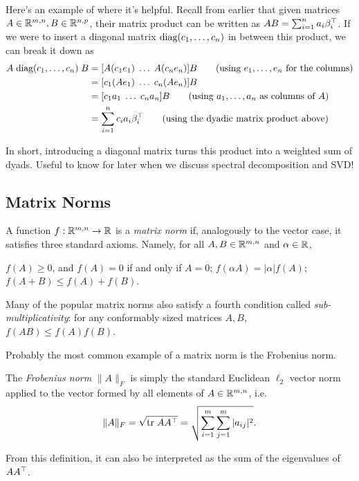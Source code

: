 \documentclass[11 pt]{scrartcl}
\begin{document}
Here's an example of where it's helpful. 
Recall from earlier that given matrices $A\in \mathbb R^{m,n}, B \in \mathbb R^{n,p}$, their matrix product can be written as $AB = \sum_{i=1}^n a_i \beta_i^\top$.  
If we were to insert a diagonal matrix $\text{diag}(c_1,\dots, c_n)$ in between this product, we can break it down as 
\begin{align*}
    A \;\text{diag}(c_1, \dots, c_n)\; B &= [A(c_1e_1)\; \dots \; A(c_n e_n)] B  \tag{using $e_1, \dots, e_n$ for the columns} \\
                                   &= [c_1 (Ae_1)\; \dots \; c_n (Ae_n)] B \\ 
                                   &= [c_1 a_1 \; \dots \; c_n a_n ] B \tag{using $a_1,\dots, a_n$ as columns of $A$}\\ 
                                   &= \sum_{i=1}^n c_i a_i\beta_i^\top \tag{using the dyadic matrix product above}
\end{align*}

In short, introducing a diagonal matrix turns this product into a weighted sum of dyads.
Useful to know for later when we discuss spectral decomposition and SVD!

\subsection{Matrix Norms}

\begin{definition}
    A function $f:\mathbb R^{m,n}\to \mathbb R$ is a \emph{matrix norm} if, analogously to the vector case, it satisfies three standard axioms. 
    Namely, for all $A,B\in \mathbb R^{m,n}$ and $\alpha\in \mathbb R$, 
    \begin{itemize}
        \ii $f(A)\geq 0$, and $f(A) = 0$ if and only if $A = 0$; 
        \ii $f(\alpha A) = |\alpha| f(A)$; 
        \ii $f(A+B) \leq f(A) + f(B)$. 
    \end{itemize}
    Many of the popular matrix norms also satisfy a fourth condition called \emph{sub-multiplicativity}: for any conformably sized matrices $A,B$, $f(AB) \leq f(A) f(B)$. 
\end{definition}

Probably the most common example of a matrix norm is the Frobenius norm.

\begin{definition}
    The \emph{Frobenius norm} $\|A\|_F$ is simply the standard Euclidean $\ell_2$ vector norm applied to the vector formed by all elements of $A\in \mathbb R^{m,n}$, i.e. 
    \[ \|A\|_F = \sqrt{\text{tr} \; AA^\top} = \sqrt{\sum_{i=1}^m \sum_{j=1}^m |a_{ij}|^2}.\] 
\end{definition}
From this definition, it can also be interpreted as the sum of the eigenvalues of $AA^\top$. 
\end{document}
